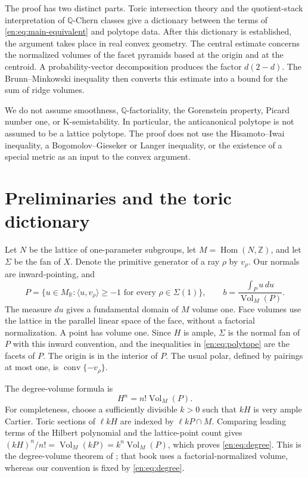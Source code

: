 \documentclass[12pt]{amsart}
\theoremstyle{definition}
\theoremstyle{remark}
\numberwithin{equation}{section}
\theoremstyle{plain}
\theoremstyle{definition}
\theoremstyle{remark}
\begin{document}
The proof has two distinct parts. Toric intersection theory and the quotient-stack interpretation of $\mathbb Q$-Chern classes give a dictionary between the terms of \eqref{en:eq:main-equivalent} and polytope data. After this dictionary is established, the argument takes place in real convex geometry. The central estimate concerns the normalized volumes of the facet pyramids based at the origin and at the centroid. A probability-vector decomposition produces the factor $d(2-d)$. The Brunn--Minkowski inequality then converts this estimate into a bound for the sum of ridge volumes.

We do not assume smoothness, $\mathbb Q$-factoriality, the Gorenstein property, Picard number one, or K-semistability. In particular, the anticanonical polytope is not assumed to be a lattice polytope. The proof does not use the Hisamoto--Iwai inequality, a Bogomolov--Gieseker or Langer inequality, or the existence of a special metric as an input to the convex argument.

\section{Preliminaries and the toric dictionary}\label{en:sec:dictionary}
Let $N$ be the lattice of one-parameter subgroups, let $M=\operatorname{Hom}(N,\mathbb Z)$, and let $\Sigma$ be the fan of $X$. Denote the primitive generator of a ray $\rho$ by $v_\rho$. Our normals are inward-pointing, and
\begin{equation}\label{en:eq:polytope}
 P=\{u\in M_{\mathbb R}:\langle u,v_\rho\rangle\ge-1
       \text{ for every }\rho\in\Sigma(1)\},\qquad
 b=\frac{\int_Pu\,du}{\operatorname{Vol}_M(P)}.
\end{equation}
The measure $du$ gives a fundamental domain of $M$ volume one. Face volumes use the lattice in the parallel linear space of the face, without a factorial normalization. A point has volume one. Since $H$ is ample, $\Sigma$ is the normal fan of $P$ with this inward convention, and the inequalities in \eqref{en:eq:polytope} are the facets of $P$. The origin is in the interior of $P$. The usual polar, defined by pairings at most one, is $\operatorname{conv}\{-v_\rho\}$.

The degree-volume formula is
\begin{equation}\label{en:eq:degree}
 H^n=n!\operatorname{Vol}_M(P).
\end{equation}
For completeness, choose a sufficiently divisible $k>0$ such that $kH$ is very ample Cartier. Toric sections of $\ell kH$ are indexed by $\ell kP\cap M$. Comparing leading terms of the Hilbert polynomial and the lattice-point count gives
$(kH)^n/n!=\operatorname{Vol}_M(kP)=k^n\operatorname{Vol}_M(P)$, which proves \eqref{en:eq:degree}. This is the degree-volume theorem of \cite[Theorem~13.4.3]{en:CLS}; that book uses a factorial-normalized volume, whereas our convention is fixed by \eqref{en:eq:degree}.
\end{document}
